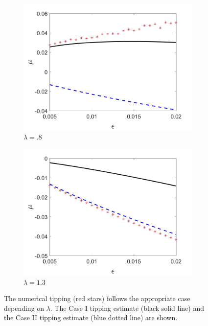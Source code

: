 \begin{figure}[H]
\centering
\begin{subfigure}{.5\textwidth}
  \centering
  \includegraphics[width=\linewidth]{oneD/slowosc_epscomp_case2.jpg}
  \caption{$\lambda=.8$}
\end{subfigure}%
\begin{subfigure}{.5\textwidth}
  \centering
  \includegraphics[width=\linewidth]{oneD/slowosc_epscomp_case3.jpg}
  \caption{$\lambda=1.3$}
\end{subfigure}
\caption{The numerical tipping (red stars) follows the appropriate case depending on $\lambda$. The Case I tipping estimate (black solid line) and the Case II tipping estimate (blue dotted line) are shown.}
\label{fig:oneD_slowosc_epscomp}
\end{figure}

